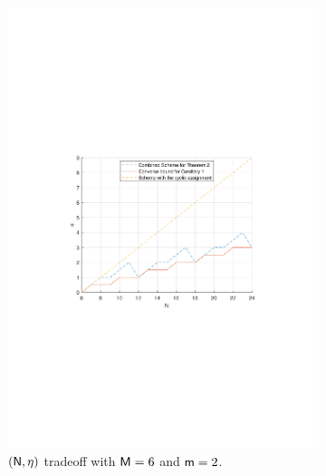 \documentclass[conference,letterpaper]{IEEEtran}
\begin{document}
\begin{figure}[ht]
\begin{subfigure}[t]{0.5\textwidth}
        \includegraphics[scale=0.5]{N varies.pdf}
        \caption{\small $({\sf N},\eta)$ tradeoff with ${\sf M}=6$ and ${\sf m}=2$.}
        \label{fig:numerical 1b}
    \end{subfigure}\\
    \begin{subfigure}[t]{0.5\textwidth}
        \centering

\end{subfigure}
\end{figure}
\end{document}
